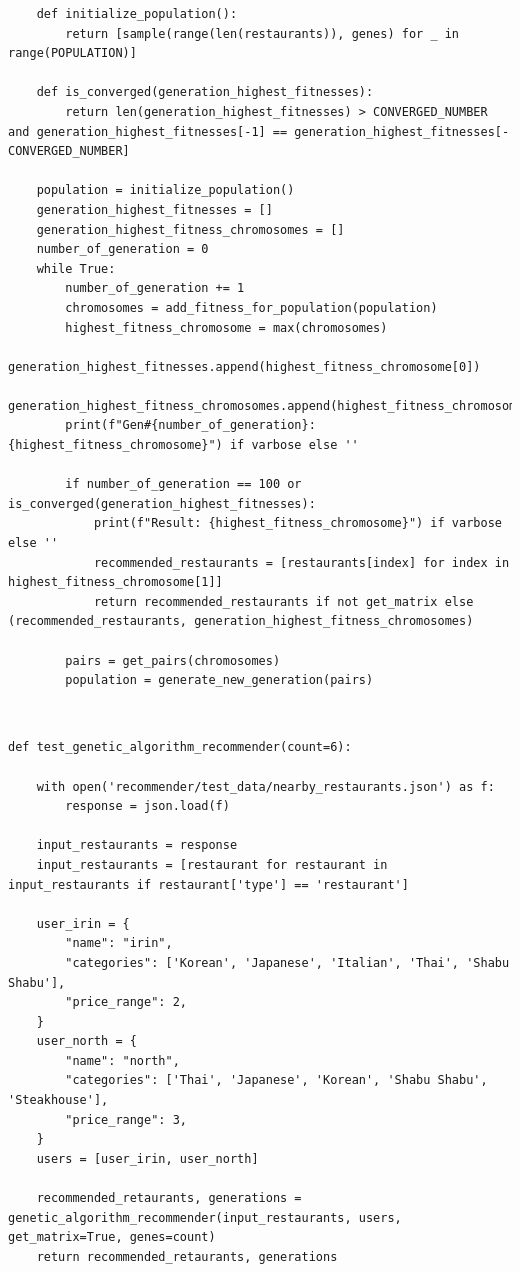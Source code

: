 \documentclass[12pt,oneside,openright,a4paper]{cpe-english-project}
\begin{document}
\begin{lstlisting}
    def initialize_population():
        return [sample(range(len(restaurants)), genes) for _ in range(POPULATION)]

    def is_converged(generation_highest_fitnesses):
        return len(generation_highest_fitnesses) > CONVERGED_NUMBER and generation_highest_fitnesses[-1] == generation_highest_fitnesses[-CONVERGED_NUMBER]

    population = initialize_population()
    generation_highest_fitnesses = []
    generation_highest_fitness_chromosomes = []
    number_of_generation = 0
    while True:
        number_of_generation += 1
        chromosomes = add_fitness_for_population(population)
        highest_fitness_chromosome = max(chromosomes)
        generation_highest_fitnesses.append(highest_fitness_chromosome[0])
        generation_highest_fitness_chromosomes.append(highest_fitness_chromosome)
        print(f"Gen#{number_of_generation}: {highest_fitness_chromosome}") if varbose else ''

        if number_of_generation == 100 or is_converged(generation_highest_fitnesses):
            print(f"Result: {highest_fitness_chromosome}") if varbose else ''
            recommended_restaurants = [restaurants[index] for index in highest_fitness_chromosome[1]]
            return recommended_restaurants if not get_matrix else (recommended_restaurants, generation_highest_fitness_chromosomes)
            
        pairs = get_pairs(chromosomes)
        population = generate_new_generation(pairs)
\end{lstlisting}


 \\

\begin{lstlisting}
def test_genetic_algorithm_recommender(count=6):

    with open('recommender/test_data/nearby_restaurants.json') as f:
        response = json.load(f)

    input_restaurants = response
    input_restaurants = [restaurant for restaurant in input_restaurants if restaurant['type'] == 'restaurant']

    user_irin = {
        "name": "irin",
        "categories": ['Korean', 'Japanese', 'Italian', 'Thai', 'Shabu Shabu'],
        "price_range": 2,
    }
    user_north = {
        "name": "north",
        "categories": ['Thai', 'Japanese', 'Korean', 'Shabu Shabu', 'Steakhouse'],
        "price_range": 3,
    }
    users = [user_irin, user_north]
    
    recommended_retaurants, generations = genetic_algorithm_recommender(input_restaurants, users, get_matrix=True, genes=count)
    return recommended_retaurants, generations
\end{lstlisting}
\end{document}

